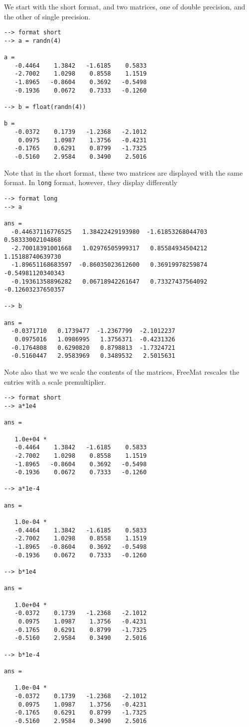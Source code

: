 We start with the short format, and two matrices, one of double precision, and the
other of single precision.
\begin{verbatim}
--> format short
--> a = randn(4)

a = 
   -0.4464    1.3842   -1.6185    0.5833 
   -2.7002    1.0298    0.8558    1.1519 
   -1.8965   -0.8604    0.3692   -0.5498 
   -0.1936    0.0672    0.7333   -0.1260 

--> b = float(randn(4))

b = 
   -0.0372    0.1739   -1.2368   -2.1012 
    0.0975    1.0987    1.3756   -0.4231 
   -0.1765    0.6291    0.8799   -1.7325 
   -0.5160    2.9584    0.3490    2.5016 
\end{verbatim}
Note that in the short format, these two matrices are displayed with the same format.
In \verb|long| format, however, they display differently
\begin{verbatim}
--> format long
--> a

ans = 
  -0.44637116776525   1.38422429193980  -1.61853268044703   0.58333002104868 
  -2.70018391001668   1.02976505999317   0.85584934504212   1.15188740639730 
  -1.89651168683597  -0.86035023612600   0.36919978259874  -0.54981120340343 
  -0.19361358896282   0.06718942261647   0.73327437564092  -0.12603237650357 

--> b

ans = 
  -0.0371710   0.1739477  -1.2367799  -2.1012237 
   0.0975016   1.0986995   1.3756371  -0.4231326 
  -0.1764808   0.6290820   0.8798813  -1.7324721 
  -0.5160447   2.9583969   0.3489532   2.5015631 
\end{verbatim}
Note also that we we scale the contents of the matrices, FreeMat rescales the entries
with a scale premultiplier.
\begin{verbatim}
--> format short
--> a*1e4

ans = 

   1.0e+04 * 
   -0.4464    1.3842   -1.6185    0.5833 
   -2.7002    1.0298    0.8558    1.1519 
   -1.8965   -0.8604    0.3692   -0.5498 
   -0.1936    0.0672    0.7333   -0.1260 

--> a*1e-4

ans = 

   1.0e-04 * 
   -0.4464    1.3842   -1.6185    0.5833 
   -2.7002    1.0298    0.8558    1.1519 
   -1.8965   -0.8604    0.3692   -0.5498 
   -0.1936    0.0672    0.7333   -0.1260 

--> b*1e4

ans = 

   1.0e+04 * 
   -0.0372    0.1739   -1.2368   -2.1012 
    0.0975    1.0987    1.3756   -0.4231 
   -0.1765    0.6291    0.8799   -1.7325 
   -0.5160    2.9584    0.3490    2.5016 

--> b*1e-4

ans = 

   1.0e-04 * 
   -0.0372    0.1739   -1.2368   -2.1012 
    0.0975    1.0987    1.3756   -0.4231 
   -0.1765    0.6291    0.8799   -1.7325 
   -0.5160    2.9584    0.3490    2.5016 
\end{verbatim}
